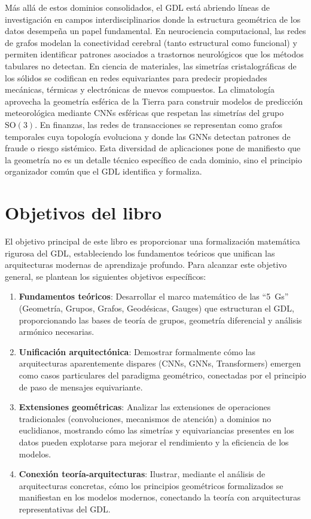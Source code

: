 Más allá de estos dominios consolidados, el \gls{GDL} está abriendo líneas de investigación en campos interdisciplinarios donde la estructura geométrica de los datos desempeña un papel fundamental. En neurociencia computacional, las redes de grafos modelan la conectividad cerebral (tanto estructural como funcional) y permiten identificar patrones asociados a trastornos neurológicos que los métodos tabulares no detectan. En ciencia de materiales, las simetrías cristalográficas de los sólidos se codifican en redes equivariantes para predecir propiedades mecánicas, térmicas y electrónicas de nuevos compuestos. La climatología aprovecha la geometría esférica de la Tierra para construir modelos de predicción meteorológica mediante \glspl{CNN} esféricas que respetan las simetrías del grupo $\text{SO}(3)$. En finanzas, las redes de transacciones se representan como grafos temporales cuya topología evoluciona y donde las \glspl{GNN} detectan patrones de fraude o riesgo sistémico. Esta diversidad de aplicaciones pone de manifiesto que la geometría no es un detalle técnico específico de cada dominio, sino el principio organizador común que el \gls{GDL} identifica y formaliza.

\section{Objetivos del libro}\label{sec:objetivos_trabajo}

El objetivo principal de este libro es proporcionar una formalización matemática rigurosa del \gls{GDL}, estableciendo los fundamentos teóricos que unifican las arquitecturas modernas de aprendizaje profundo. Para alcanzar este objetivo general, se plantean los siguientes objetivos específicos:

\begin{enumerate}
    \item \textbf{Fundamentos teóricos}: Desarrollar el marco matemático de las ``5~Gs'' (Geometría, Grupos, Grafos, Geodésicas, Gauges) que estructuran el \gls{GDL}, proporcionando las bases de teoría de grupos, geometría diferencial y análisis armónico necesarias.

    \item \textbf{Unificación arquitectónica}: Demostrar formalmente cómo las arquitecturas aparentemente dispares (\glspl{CNN}, \glspl{GNN}, \glspl{Transformer}) emergen como casos particulares del paradigma geométrico, conectadas por el principio de paso de mensajes equivariante.

    \item \textbf{Extensiones geométricas}: Analizar las extensiones de operaciones tradicionales (convoluciones, mecanismos de atención) a dominios no euclidianos, mostrando cómo las simetrías y equivariancias presentes en los datos pueden explotarse para mejorar el rendimiento y la eficiencia de los modelos.

    \item \textbf{Conexión teoría-arquitecturas}: Ilustrar, mediante el análisis de arquitecturas concretas, cómo los principios geométricos formalizados se manifiestan en los modelos modernos, conectando la teoría con arquitecturas representativas del \gls{GDL}.
\end{enumerate}

